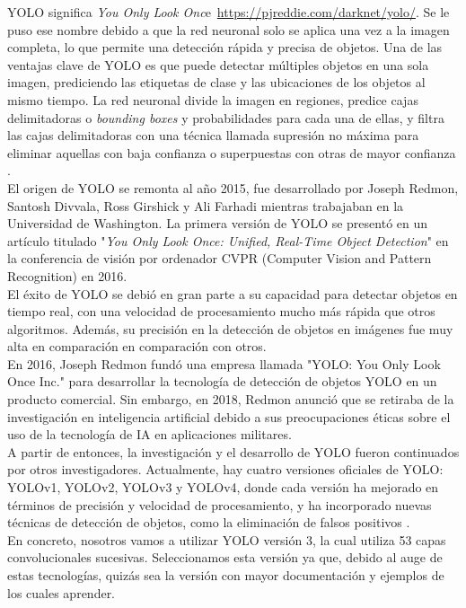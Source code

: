 YOLO significa \textit{You Only Look Onc}e\  \url{https://pjreddie.com/darknet/yolo/}. Se le puso ese nombre debido a que la red neuronal solo se aplica una vez a la imagen completa, lo que permite una detección rápida y precisa de objetos. Una de las ventajas clave de YOLO es que puede detectar múltiples objetos en una sola imagen, prediciendo las etiquetas de clase y las ubicaciones de los objetos al mismo tiempo. La red neuronal divide la imagen en regiones, predice cajas delimitadoras o \textit{bounding boxes} y probabilidades para cada una de ellas, y filtra las cajas delimitadoras con una técnica llamada supresión no máxima para eliminar aquellas con baja confianza o superpuestas con otras de mayor confianza \cite{yolo1}.\\

El origen de YOLO se remonta al año 2015, fue desarrollado por Joseph Redmon, Santosh Divvala, Ross Girshick y Ali Farhadi mientras trabajaban en la Universidad de Washington. La primera versión de YOLO se presentó en un artículo titulado "\textit{You Only Look Once: Unified, Real-Time Object Detection}" en la conferencia de visión por ordenador CVPR (Computer Vision and Pattern Recognition) en 2016. \\

El éxito de YOLO se debió en gran parte a su capacidad para detectar objetos en tiempo real, con una velocidad de procesamiento mucho más rápida que otros algoritmos. Además, su precisión en la detección de objetos en imágenes fue muy alta en comparación en comparación con otros.\\

En 2016, Joseph Redmon fundó una empresa llamada "YOLO: You Only Look Once Inc." para desarrollar la tecnología de detección de objetos YOLO en un producto comercial. Sin embargo, en 2018, Redmon anunció que se retiraba de la investigación en inteligencia artificial debido a sus preocupaciones éticas sobre el uso de la tecnología de IA en aplicaciones militares.\\

A partir de entonces, la investigación y el desarrollo de YOLO fueron continuados por otros investigadores. Actualmente, hay cuatro versiones oficiales de YOLO: YOLOv1, YOLOv2, YOLOv3 y YOLOv4, donde cada versión ha mejorado en términos de precisión y velocidad de procesamiento, y ha incorporado nuevas técnicas de detección de objetos, como la eliminación de falsos positivos \cite{yolo2}.\\

En concreto, nosotros vamos a utilizar YOLO versión 3, la cual utiliza 53 capas convolucionales sucesivas. Seleccionamos esta versión ya que, debido al auge de estas tecnologías, quizás sea la versión con mayor documentación y ejemplos de los cuales aprender.\\

